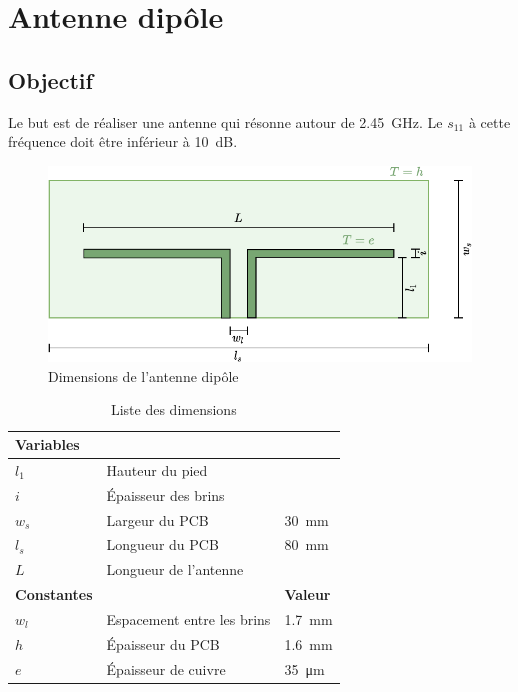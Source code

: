 \documentclass[Deriaz_Traiber_Labo02]{subfiles}
\begin{document}
\chapter{Antenne dipôle}
\section{Objectif}
Le but est de réaliser une antenne qui résonne autour de \SI{2.45}{\giga\hertz}. Le $s_{11}$ à cette fréquence doit être inférieur à \SI{10}{\deci\bel}.


\begin{figure}[H]
\centering
\includegraphics[scale=1,page=1]{../Schemas-crop.pdf}
\caption{Dimensions de l'antenne dipôle}
\label{fig:Schemas-crop}
\end{figure}
\begin{table}[H]
\centering
\begin{tabular}{lll}
\textbf{Variables}\\\hline
$l_1$ & Hauteur du pied\\
$i$   & Épaisseur des brins\\
$w_s$ & Largeur du PCB & \SI{30}{\milli\meter}\\
$l_s$ & Longueur du PCB & \SI{80}{\milli\meter}\\
$L$   & Longueur de l'antenne\\
\textbf{Constantes} & & \textbf{Valeur}\\\hline
$w_l$ & Espacement entre les brins & \SI{1.7}{\milli\meter}\\
$h$ & Épaisseur du PCB & \SI{1.6}{\milli\meter}\\
$e$ & Épaisseur de cuivre & \SI{35}{\micro\meter}
\end{tabular}
\caption{Liste des dimensions}
\end{table}

\end{document}
